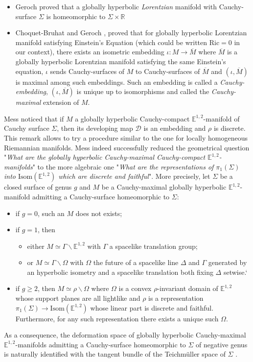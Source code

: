 \documentclass[a4paper,12pt]{article}
\def\D{\mathcal{D}}
\def\isom{Isom}
\def\D{\mathcal{D}}
\def\RR{\mathbb{R}}
\newcommand{\mass}[1]{{\mathbb E}^{1,2}_{#1}}
\def\isom{\mathrm{Isom}}
\begin{document}
\begin{itemize}
\item  Geroch \cite{MR0270697} proved that a globally hyperbolic {\it Lorentzian} manifold with Cauchy-surface $\Sigma$ is homeomorphic to $\Sigma\times \RR$
\item Choquet-Bruhat and Geroch \cite{MR0250640,sbierski_geroch}, proved that for globally hyperbolic Lorentzian manifold satisfying  Einstein's Equation (which  could be written $\mathrm{Ric}=0$ in our context), there exists an isometric embedding $\iota: M \rightarrow \overline M$ where $\overline M$ is a globally hyperbolic Lorentzian manifold satisfying the same Einstein's equation, $\iota$ sends Cauchy-surfaces of $M$ to Cauchy-surfaces of $\overline M$ and 
$(\iota,\overline M)$ is maximal among such embeddings. Such an embedding is called a {\it Cauchy-embedding}, $(\iota,\overline M)$ is unique up to isomorphisms and called the {\it Cauchy-maximal} extension of $M$. 
\end{itemize} 


Mess \cite{mess,andersson:hal-00642328} noticed that if $M$ a globally hyperbolic Cauchy-compact $\mass{}$-manifold of Cauchy surface $\Sigma$, then its developing map $\D$ is an embedding and $\rho$ is discrete. This remark allows to try a  procedure similar to the one  for  locally homogeneous Riemannian manifolds.
Mess indeed successfully reduced the geometrical question "{\it What are the globally hyperbolic Cauchy-maximal Cauchy-compact $\mass{}$-manifolds}" to the more algebraic one "{\it What are the representations of $\pi_1(\Sigma)$ into $\isom(\mass{})$ which are  discrete and faithful}".
More precisely,
let $\Sigma$ be a closed surface of genus $g$ and $M$ be  a Cauchy-maximal globally hyperbolic $\mass{}$-manifold admitting a Cauchy-surface homeomorphic to $\Sigma$: 
\begin{itemize}
\item if $g=0$, such an $M$ does not exists;
\item if $g=1$, then 
\begin{itemize}
 \item either $M \simeq \Gamma \backslash \mass{} $  with $\Gamma$ a spacelike translation group; 
 \item or $M \simeq \Gamma \backslash \Omega $   with $\Omega$ the future of a spacelike line $\Delta$ and $\Gamma$ generated by an hyperbolic isometry and a spacelike translation both fixing $\Delta$ setwise.`
\end{itemize}

\item if $g\geq 2 $, then $M\simeq \rho\backslash\Omega$ where $\Omega$ is a convex $\rho$-invariant domain of $\mass{}$  whose support planes are all lightlike and $\rho$ is a  representation $\pi_1(\Sigma)\rightarrow \isom(\mass{})$ whose linear part 
is discrete and faithful. Furthermore, for any such representation there exists a unique such $\Omega$.
\end{itemize}  
 As a consequence, the deformation space of globally hyperbolic Cauchy-maximal $\mass{}$-manifolds admitting a Cauchy-surface homeomorphic to $\Sigma$ of negative genus is naturally identified with the tangent bundle of the Teichmüller space of $\Sigma$ \cite{MR762512}. 
 
\end{document}
